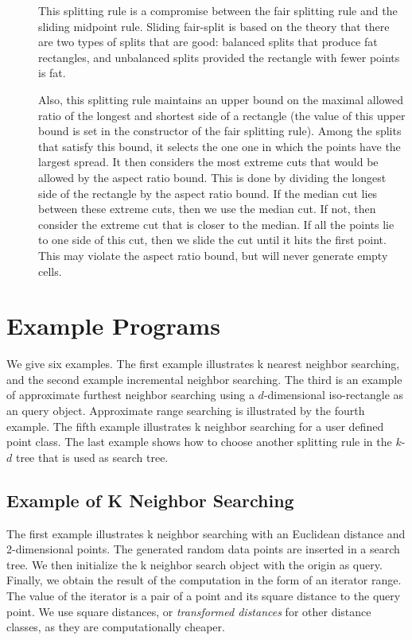 \begin{description}
\item[ ]

This splitting rule is a compromise between the fair splitting rule
and the sliding midpoint rule.  Sliding fair-split is based on the
theory that there are two types of splits that are good: balanced
splits that produce fat rectangles, and unbalanced splits provided the
rectangle with fewer points is fat.

Also, this splitting rule maintains an upper bound on the maximal
allowed ratio of the longest and shortest side of a rectangle (the
value of this upper bound is set in the constructor of the fair
splitting rule). Among the splits that satisfy this bound, it selects
the one one in which the points have the largest spread.  It then
considers the most extreme cuts that would be allowed by the aspect
ratio bound. This is done by dividing the longest side of the
rectangle by the aspect ratio bound. If the median cut lies between
these extreme cuts, then we use the median cut. If not, then consider
the extreme cut that is closer to the median.  If all the points lie
to one side of this cut, then we slide the cut until it hits the first
point.  This may violate the aspect ratio bound, but will never
generate empty cells.

\end{description}




\section{Example Programs}

We give six examples.  The first example illustrates k nearest neighbor
searching, and the second example incremental neighbor searching. 
The third is an example of approximate furthest neighbor searching
using a $d$-dimensional iso-rectangle as an query object.  Approximate
range searching is illustrated by the fourth example.  The fifth
example illustrates k neighbor searching for a user defined point
class. The last example shows how to choose another splitting rule in the
$k$-$d$ tree that is used as search tree.

\newpage
\subsection{Example of K Neighbor Searching}

The first example illustrates k neighbor searching with an Euclidean
distance and 2-dimensional points. The generated random
data points are inserted in a search tree. We then initialize
the k neighbor search object with the origin as query. Finally, we 
obtain the result of the computation in the form of an iterator
range. The value of the iterator is a pair of a point and its square
distance to the query point. We use square distances, or {\em
transformed distances} for other distance classes, as they are 
computationally cheaper.

